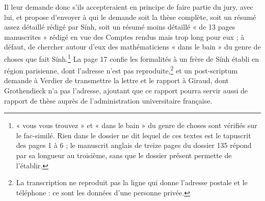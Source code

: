 \documentclass[11pt,a4paper]{article}
\begin{document}
Il leur demande donc s'ils accepteraient en principe de faire partie du jury,
avec lui, et propose d'envoyer à qui le demande soit la thèse complète, soit
un résumé assez détaillé rédigé par Sính, soit un résumé moins détaillé « de
13 pages manuscrites » rédigé en vue des Comptes rendus mais trop long pour
eux ; à défaut, de chercher autour d'eux des mathématiciens « dans le bain »
du genre de choses que fait Sính.\footnote{« vous vous trouvez » et « dans le
bain » du genre de choses sont vérifiés sur le fac-similé. Rien dans le
dossier ne dit lequel de ces textes est le tapuscrit des pages 1 à 6 ; le
manuscrit anglais de treize pages du dossier 135 répond par sa longueur au
troisième, sans que le dossier présent permette de l'établir.} La page 17
confie les formalités à un frère de Sính établi en région parisienne, dont
l'adresse n'est pas reproduite,\footnote{La transcription ne reproduit pas
la ligne qui donne l'adresse postale et le téléphone : ce sont les données
d'une personne privée.} et un post-scriptum demande à Verdier de transmettre
la lettre et le rapport à Giraud, dont Grothendieck n'a pas l'adresse,
ajoutant que ce rapport pourra servir aussi de rapport de thèse auprès de
l'administration universitaire française.
\end{document}
